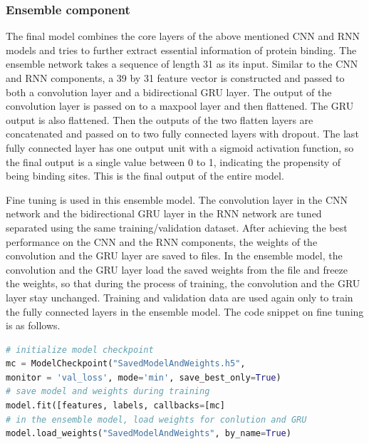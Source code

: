 \subsubsection{Ensemble component}
The final model combines the core layers of the above mentioned CNN and RNN models and tries to further extract essential information of protein binding. The ensemble network takes a sequence of length 31 as its input. Similar to the CNN and RNN components, a 39 by 31 feature vector is constructed and passed to both a convolution layer and a bidirectional GRU layer. The output of the convolution layer is passed on to a maxpool layer and then flattened. The GRU output is also flattened. Then the outputs of the two flatten layers are concatenated and passed on to two fully connected layers with dropout. The last fully connected layer has one output unit with a sigmoid activation function, so the final output is a single value between 0 to 1, indicating the propensity of being binding sites. This is the final output of the entire model. 

Fine tuning is used in this ensemble model. The convolution layer in the CNN network and the bidirectional GRU layer in the RNN network are tuned separated using the same training/validation dataset. After achieving the best performance on the CNN and the RNN components, the weights of the convolution and the GRU layer are saved to files. In the ensemble model, the convolution and the GRU layer load the saved weights from the file and freeze the weights, so that during the process of training, the convolution and the GRU layer stay unchanged. Training and validation data are used again only to train the fully connected layers in the ensemble model. The code snippet on fine tuning is as follows.
\begin{lstlisting}[language=python,frame=single]
# initialize model checkpoint
mc = ModelCheckpoint("SavedModelAndWeights.h5",
monitor = 'val_loss', mode='min', save_best_only=True)
# save model and weights during training
model.fit([features, labels, callbacks=[mc]
# in the ensemble model, load weights for conlution and GRU
model.load_weights("SavedModelAndWeights", by_name=True)
\end{lstlisting}

